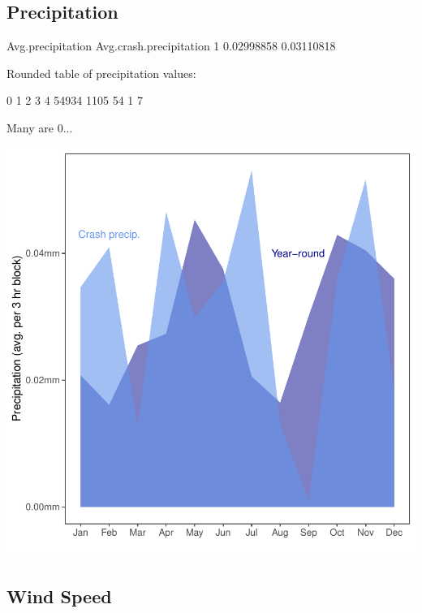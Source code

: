 \documentclass[11pt, a4paper]{article}
\begin{document}
\pagebreak
\subsection{Precipitation}

\begin{Schunk}
\begin{Soutput}
  Avg.precipitation Avg.crash.precipitation
1        0.02998858              0.03110818
\end{Soutput}
\begin{Soutput}
Rounded table of precipitation values:
\end{Soutput}
\begin{Soutput}
    0     1     2     3     4 
54934  1105    54     1     7 
\end{Soutput}
\begin{Soutput}
Many are 0...
\end{Soutput}
\end{Schunk}
\includegraphics{variableinvestigation-012}


\pagebreak
\subsection{Wind Speed}
\end{document}
